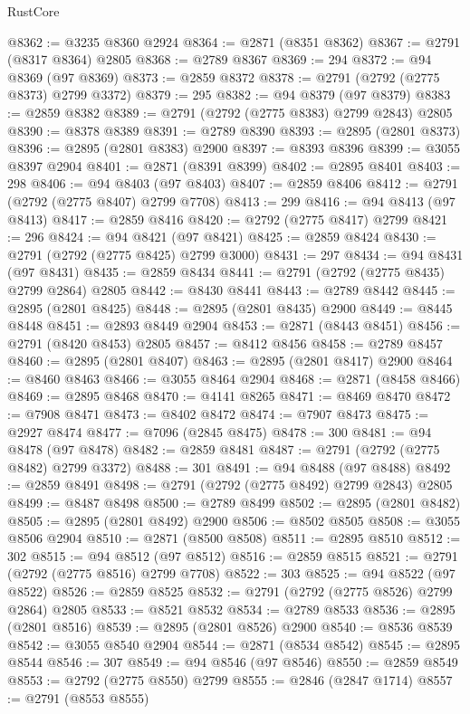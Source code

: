 \begin{lexlean}{RustCore}
\begin{coremodule}
@8362 := @3235 @8360 @2924
@8364 := @2871 (@8351 @8362)
@8367 := @2791 (@8317 @8364) @2805
@8368 := @2789 @8367
@8369 := 294
@8372 := @94 @8369 (@97 @8369)
@8373 := @2859 @8372
@8378 := @2791 (@2792 (@2775 @8373) @2799 @3372)
@8379 := 295
@8382 := @94 @8379 (@97 @8379)
@8383 := @2859 @8382
@8389 := @2791 (@2792 (@2775 @8383) @2799 @2843) @2805
@8390 := @8378 @8389
@8391 := @2789 @8390
@8393 := @2895 (@2801 @8373)
@8396 := @2895 (@2801 @8383) @2900
@8397 := @8393 @8396
@8399 := @3055 @8397 @2904
@8401 := @2871 (@8391 @8399)
@8402 := @2895 @8401
@8403 := 298
@8406 := @94 @8403 (@97 @8403)
@8407 := @2859 @8406
@8412 := @2791 (@2792 (@2775 @8407) @2799 @7708)
@8413 := 299
@8416 := @94 @8413 (@97 @8413)
@8417 := @2859 @8416
@8420 := @2792 (@2775 @8417) @2799
@8421 := 296
@8424 := @94 @8421 (@97 @8421)
@8425 := @2859 @8424
@8430 := @2791 (@2792 (@2775 @8425) @2799 @3000)
@8431 := 297
@8434 := @94 @8431 (@97 @8431)
@8435 := @2859 @8434
@8441 := @2791 (@2792 (@2775 @8435) @2799 @2864) @2805
@8442 := @8430 @8441
@8443 := @2789 @8442
@8445 := @2895 (@2801 @8425)
@8448 := @2895 (@2801 @8435) @2900
@8449 := @8445 @8448
@8451 := @2893 @8449 @2904
@8453 := @2871 (@8443 @8451)
@8456 := @2791 (@8420 @8453) @2805
@8457 := @8412 @8456
@8458 := @2789 @8457
@8460 := @2895 (@2801 @8407)
@8463 := @2895 (@2801 @8417) @2900
@8464 := @8460 @8463
@8466 := @3055 @8464 @2904
@8468 := @2871 (@8458 @8466)
@8469 := @2895 @8468
@8470 := @4141 @8265
@8471 := @8469 @8470
@8472 := @7908 @8471
@8473 := @8402 @8472
@8474 := @7907 @8473
@8475 := @2927 @8474
@8477 := @7096 (@2845 @8475)
@8478 := 300
@8481 := @94 @8478 (@97 @8478)
@8482 := @2859 @8481
@8487 := @2791 (@2792 (@2775 @8482) @2799 @3372)
@8488 := 301
@8491 := @94 @8488 (@97 @8488)
@8492 := @2859 @8491
@8498 := @2791 (@2792 (@2775 @8492) @2799 @2843) @2805
@8499 := @8487 @8498
@8500 := @2789 @8499
@8502 := @2895 (@2801 @8482)
@8505 := @2895 (@2801 @8492) @2900
@8506 := @8502 @8505
@8508 := @3055 @8506 @2904
@8510 := @2871 (@8500 @8508)
@8511 := @2895 @8510
@8512 := 302
@8515 := @94 @8512 (@97 @8512)
@8516 := @2859 @8515
@8521 := @2791 (@2792 (@2775 @8516) @2799 @7708)
@8522 := 303
@8525 := @94 @8522 (@97 @8522)
@8526 := @2859 @8525
@8532 := @2791 (@2792 (@2775 @8526) @2799 @2864) @2805
@8533 := @8521 @8532
@8534 := @2789 @8533
@8536 := @2895 (@2801 @8516)
@8539 := @2895 (@2801 @8526) @2900
@8540 := @8536 @8539
@8542 := @3055 @8540 @2904
@8544 := @2871 (@8534 @8542)
@8545 := @2895 @8544
@8546 := 307
@8549 := @94 @8546 (@97 @8546)
@8550 := @2859 @8549
@8553 := @2792 (@2775 @8550) @2799
@8555 := @2846 (@2847 @1714)
@8557 := @2791 (@8553 @8555)

\end{coremodule}
\end{lexlean}
